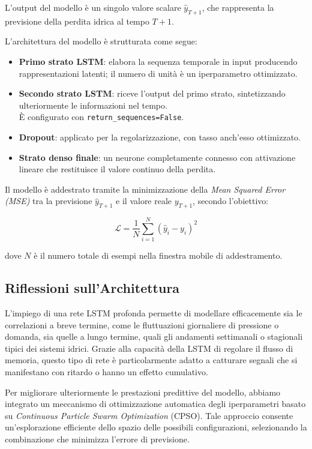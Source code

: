 \documentclass{article}
\begin{document}
L'output del modello è un singolo valore scalare $\hat{y}_{T+1}$, che rappresenta la previsione della 
perdita idrica al tempo $T+1$.

L’architettura del modello è strutturata come segue:

\begin{itemize}
    \item \textbf{Primo strato LSTM}: elabora la sequenza temporale in input producendo rappresentazioni latenti; il numero di unità è un iperparametro ottimizzato.
    \item \textbf{Secondo strato LSTM}: riceve l'output del primo strato, sintetizzando ulteriormente le informazioni nel tempo. \\È configurato con \verb|return_sequences=False|.
    \item \textbf{Dropout}: applicato per la regolarizzazione, con tasso anch'esso ottimizzato.
    \item \textbf{Strato denso finale}: un neurone completamente connesso con attivazione lineare che restituisce il valore continuo della perdita.
\end{itemize}

Il modello è addestrato tramite la minimizzazione della \textit{Mean Squared Error (MSE)} tra la 
previsione $\hat{y}_{T+1}$ e il valore reale $y_{T+1}$, secondo l’obiettivo:

\begin{equation}
\mathcal{L} = \frac{1}{N} \sum_{i=1}^N \left( \hat{y}_{i} - y_{i} \right)^2
\end{equation}

dove $N$ è il numero totale di esempi nella finestra mobile di addestramento.

\subsection{Riflessioni sull’Architettura}

L’impiego di una rete LSTM profonda permette di modellare efficacemente sia le correlazioni a breve termine, come le fluttuazioni giornaliere di pressione o domanda, sia quelle a lungo termine, quali gli andamenti settimanali o stagionali tipici dei sistemi idrici. Grazie alla capacità della LSTM di regolare il flusso di memoria, questo tipo di rete è particolarmente adatto a catturare segnali che si manifestano con ritardo o hanno un effetto cumulativo.

Per migliorare ulteriormente le prestazioni predittive del modello, abbiamo integrato un meccanismo di ottimizzazione automatica degli iperparametri basato su \textit{Continuous Particle Swarm Optimization} (CPSO). Tale approccio consente un’esplorazione efficiente dello spazio delle possibili configurazioni, selezionando la combinazione che minimizza l’errore di previsione.
\end{document}
